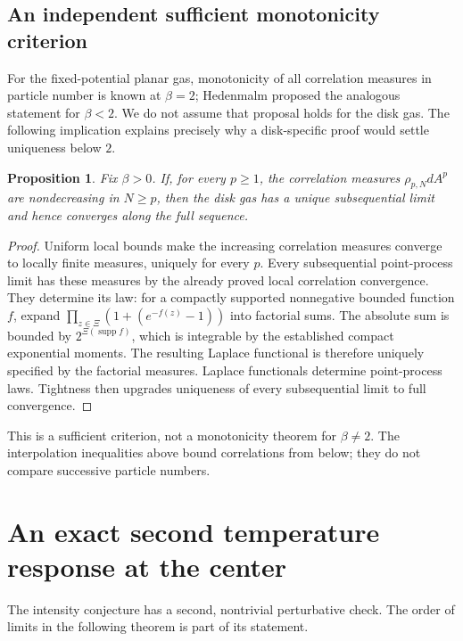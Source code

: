 \documentclass[11pt,a4paper]{article}
\numberwithin{equation}{section}
\newtheorem{proposition}[theorem]{Proposition}
\theoremstyle{definition}
\theoremstyle{remark}
\begin{document}
\subsection{An independent sufficient monotonicity criterion}
\label{subsec:correlation-monotonicity-criterion}

For the fixed-potential planar gas, monotonicity of all correlation
measures in particle number is known at $\beta=2$; Hedenmalm
\cite[slide 6]{Hedenmalm2015} proposed the analogous statement for
$\beta<2$. We do not assume that proposal holds for the disk gas.
The following implication explains precisely why a disk-specific
proof would settle uniqueness below $2$.

\begin{proposition}
\label{prop:all-correlation-monotonicity-uniqueness}
Fix $\beta>0$. If, for every $p\ge1$, the correlation measures
$\rho_{p,N}dA^p$ are nondecreasing in $N\ge p$, then the disk gas
has a unique subsequential limit and hence converges along the full
sequence.
\end{proposition}
\begin{proof}
Uniform local bounds make the increasing correlation measures converge
to locally finite measures, uniquely for every $p$. Every subsequential
point-process limit has these measures by the already proved local
correlation convergence. They determine its law: for a compactly
supported nonnegative bounded function $f$, expand
$\prod_{z\in\Xi}(1+(e^{-f(z)}-1))$ into factorial sums. The absolute
sum is bounded by $2^{\Xi(\operatorname{supp}f)}$, which is integrable
by the established compact exponential moments. The resulting Laplace
functional is therefore uniquely specified by the factorial measures.
Laplace functionals determine point-process laws. Tightness then
upgrades uniqueness of every subsequential limit to full convergence.
\end{proof}

This is a sufficient criterion, not a monotonicity theorem for
$\beta\ne2$. The interpolation inequalities above bound correlations
from below; they do not compare successive particle numbers.


\section{An exact second temperature response at the center}
\label{sec:beta2-exact-second-center}

The intensity conjecture has a second, nontrivial perturbative check.
The order of limits in the following theorem is part of its statement.
\end{document}
